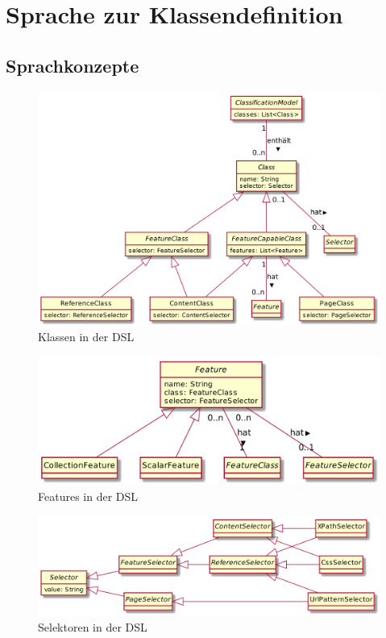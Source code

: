 \section{Sprache zur Klassendefinition}
    \subsection{Sprachkonzepte}
        \begin{figure}[htb]
            \centering
            \includegraphics[width=\textwidth]{../resources/dsl/classes.png}
            \caption{Klassen in der DSL}
            \label{image:dslClasses}
        \end{figure}

        \begin{figure}[htb]
            \centering
            \includegraphics[width=\textwidth]{../resources/dsl/features.png}
            \caption{Features in der DSL}
            \label{image:dslFeatures}
        \end{figure}

        \begin{figure}[htb]
            \centering
            \includegraphics[width=\textwidth]{../resources/dsl/selectors.png}
            \caption{Selektoren in der DSL}
            \label{image:dslSelektoren}
        \end{figure}

